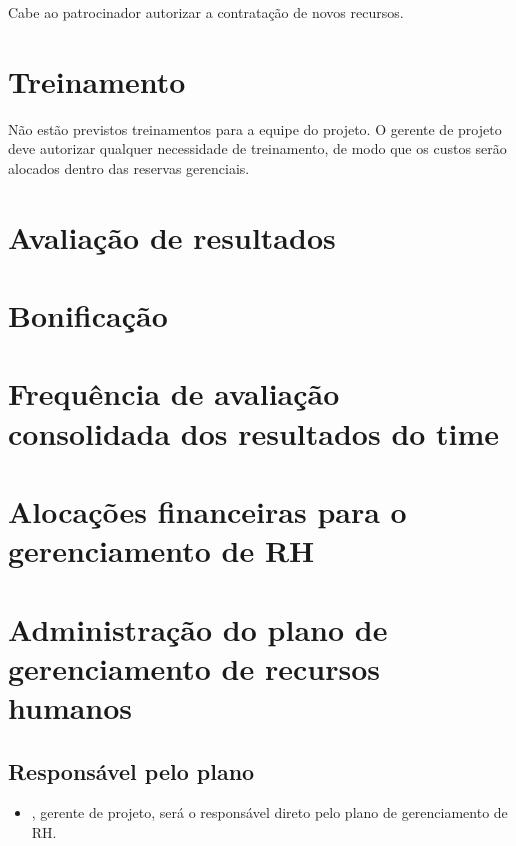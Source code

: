 Cabe ao patrocinador autorizar a contratação de novos recursos.

\section{Treinamento}

Não estão previstos treinamentos para a equipe do projeto. O gerente de projeto deve autorizar qualquer necessidade de treinamento, de modo que os custos serão alocados dentro das reservas gerenciais.

\section{Avaliação de resultados}


\section{Bonificação}


\section{Frequência de avaliação consolidada dos resultados do time}


\section{Alocações financeiras para o gerenciamento de RH}


\section{Administração do plano de gerenciamento de recursos humanos}

\subsection{Responsável pelo plano}

\begin{itemize}
	\item \projectManagerName{}, gerente de projeto, será o responsável direto pelo plano de gerenciamento de RH.
\end{itemize}

